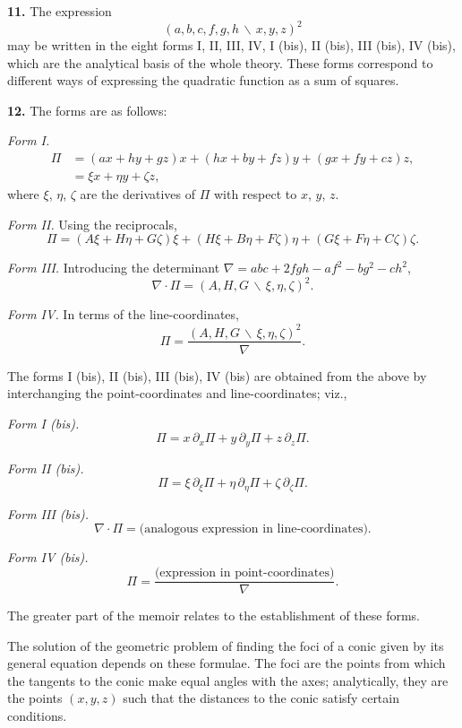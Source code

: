 \documentclass[11pt,a4paper]{article}
\theoremstyle{definition}
\begin{document}
\textbf{11.} The expression
\[(a,b,c,f,g,h\,\backslash\!\!\,x,y,z)^{2}\]
may be written in the eight forms I, II, III, IV, I (bis), II (bis), III (bis), IV (bis),
which are the analytical basis of the whole theory. These forms correspond to different
ways of expressing the quadratic function as a sum of squares.

\textbf{12.} The forms are as follows:

\textit{Form I.}
\begin{align*}
\Pi &= (ax+hy+gz)x + (hx+by+fz)y + (gx+fy+cz)z,\\
&= \xi x + \eta y + \zeta z,
\end{align*}
where $\xi$, $\eta$, $\zeta$ are the derivatives of $\Pi$ with respect to $x$, $y$, $z$.

\textit{Form II.} Using the reciprocals,
\[\Pi = (A\xi+H\eta+G\zeta)\xi + (H\xi+B\eta+F\zeta)\eta + (G\xi+F\eta+C\zeta)\zeta.\]

\textit{Form III.} Introducing the determinant $\nabla = abc + 2fgh - af^{2} - bg^{2} - ch^{2}$,
\[\nabla \cdot \Pi = (A,H,G\,\backslash\!\!\,\xi,\eta,\zeta)^{2}.\]

\textit{Form IV.} In terms of the line-coordinates,
\[\Pi = \frac{(A,H,G\,\backslash\!\!\,\xi,\eta,\zeta)^{2}}{\nabla}.\]

\newpage

The forms I (bis), II (bis), III (bis), IV (bis) are obtained from the above by
interchanging the point-coordinates and line-coordinates; viz.,

\textit{Form I (bis).}
\[\Pi = x\,\partial_{x}\Pi + y\,\partial_{y}\Pi + z\,\partial_{z}\Pi.\]

\textit{Form II (bis).}
\[\Pi = \xi\,\partial_{\xi}\Pi + \eta\,\partial_{\eta}\Pi + \zeta\,\partial_{\zeta}\Pi.\]

\textit{Form III (bis).}
\[\nabla \cdot \Pi = \text{(analogous expression in line-coordinates)}.\]

\textit{Form IV (bis).}
\[\Pi = \frac{\text{(expression in point-coordinates)}}{\nabla}.\]

The greater part of the memoir relates to the establishment of these forms.

The solution of the geometric problem of finding the foci of a conic given by its
general equation depends on these formulae. The foci are the points from which the
tangents to the conic make equal angles with the axes; analytically, they are the points
$(x,y,z)$ such that the distances to the conic satisfy certain conditions.
\end{document}
